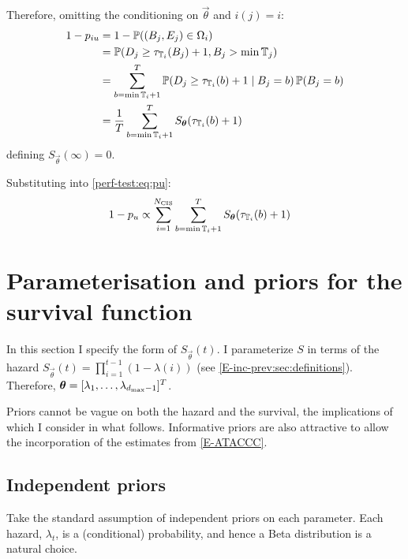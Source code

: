 \documentclass[thesis.tex]{subfiles}
\begin{document}
Therefore, omitting the conditioning on $\vec{\theta}$ and $i(j) = i$:
\begin{align}
1 - p_{iu}
&= 1 - \operatorname{\mathbb{P}}((B_{j}, E_{j}) \in \Omega_i) \\
&= \operatorname{\mathbb{P}}(D_j \geq \tau_{\mathbb{T}_{i}}(B_j)+ 1, B_j > \min \mathbb{T}_{j}) \\
&= \sum_{b = \min \mathbb{T}_{i} + 1}^T \operatorname{\mathbb{P}}(D_j \geq \tau_{\mathbb{T}_{i}}(b) + 1 \mid B_j = b) \operatorname{\mathbb{P}}(B_j = b)\\
&= \frac{1}{T} \sum_{b = \min \mathbb{T}_{i} + 1}^T S_{\bm{\theta}}(\tau_{\mathbb{T}_{i}}(b) + 1)
\end{align}
defining $S_{\vec{\theta}}(\infty) = 0$.

Substituting into \cref{perf-test:eq:pu}:
\begin{align}
1 - p_u
& \propto \sum_{i=1}^{N_\text{CIS}} \sum_{b = \min \mathbb{T}_{i} + 1}^T S_{\bm{\theta}}(\tau_{\mathbb{T}_{i}}(b) + 1)
\end{align}

\section{Parameterisation and priors for the survival function} \label{perf-test:sec:parameters-priors}

In this section I specify the form of $S_{\vec{\theta}}(t)$.
I parameterize $S$ in terms of the hazard $S_{\vec{\theta}}(t) = \prod_{i=1}^{t-1} (1 - \lambda(i))$ (see \cref{E-inc-prev:sec:definitions}).
Therefore, $\bm{\theta} = [\lambda_1, \dots, \lambda_{d_\text{max}-1}]^T$.

Priors cannot be vague on both the hazard and the survival, the implications of which I consider in what follows.
Informative priors are also attractive to allow the incorporation of the estimates from \cref{E-ATACCC}.

\subsection{Independent priors} \label{perf-test:sec:independent-priors}
Take the standard assumption of independent priors on each parameter.
Each hazard, $\lambda_t$, is a (conditional) probability, and hence a Beta distribution is a natural choice.
\end{document}
